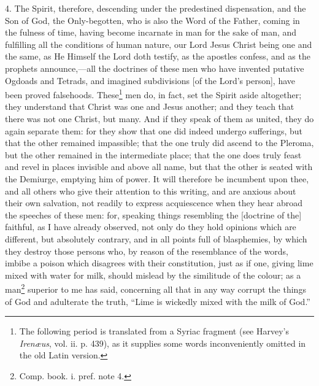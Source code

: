 4. The Spirit, therefore, descending under the predestined dispensation, and the Son of God, the Only-begotten, who is also the Word of the Father, coming in the fulness of time, having become incarnate in man for the sake of man, and fulfilling all the conditions of human nature, our Lord Jesus Christ being one and the same, as He Himself the Lord doth testify, as the apostles confess, and as the prophets announce,—all the doctrines of these men who have invented putative Ogdoads and Tetrads, and imagined subdivisions [of the Lord’s person], have been proved falsehoods. These\footnote{The following period is translated from a Syriac fragment (see Harvey’s \emph{Irenæus}, vol. ii. p. 439), as it supplies some words inconveniently omitted in the old Latin version.} men do, in fact, set the Spirit aside altogether; they understand that Christ was one and Jesus another; and they teach that there was not one Christ, but many. And if they speak of them as united, they do again separate them: for they show that one did indeed undergo sufferings, but that the other remained impassible; that the one truly did ascend to the Pleroma, but the other remained in the intermediate place; that the one does truly feast and revel in places invisible and above all name, but that the other is seated with the Demiurge, emptying him of power. It will therefore be incumbent upon thee, and all others who give their attention to this writing, and are anxious about their own salvation, not readily to express acquiescence when they hear abroad the speeches of these men: for, speaking things resembling the [doctrine of the] faithful, as I have already observed, not only do they hold opinions which are different, but absolutely contrary, and in all points full of blasphemies, by which they destroy those persons who, by reason of the resemblance of the words, imbibe a poison which disagrees with their constitution, just as if one, giving lime mixed with water for milk, should mislead by the similitude of the colour; as a man\footnote{Comp. book. i. pref. note 4.} superior to me has said, concerning all that in any way corrupt the things of God and adulterate the truth, “Lime is wickedly mixed with the milk of God.”


